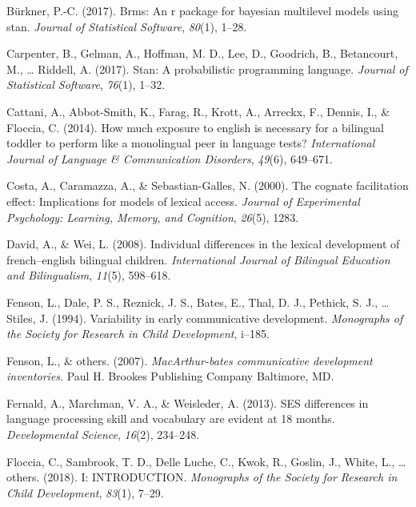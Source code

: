 \documentclass[
  english,
  man,man,floatsintext]{apa6}
\newlength{\cslhangindent}
\newenvironment{CSLReferences}[2] %
 {%
  \setlength{\parindent}{0pt}
  \ifodd #1 \everypar{\setlength{\hangindent}{\cslhangindent}}\ignorespaces\fi
  \ifnum #2 > 0
  \setlength{\parskip}{#2\baselineskip}
  \fi
 }%
 {}
\begin{document}
\begin{CSLReferences}{1}{0}
\leavevmode{}%
Bürkner, P.-C. (2017). Brms: An r package for bayesian multilevel models using stan. \emph{Journal of Statistical Software}, \emph{80}(1), 1--28.

\leavevmode{}%
Carpenter, B., Gelman, A., Hoffman, M. D., Lee, D., Goodrich, B., Betancourt, M., \ldots{} Riddell, A. (2017). Stan: A probabilistic programming language. \emph{Journal of Statistical Software}, \emph{76}(1), 1--32.

\leavevmode{}%
Cattani, A., Abbot-Smith, K., Farag, R., Krott, A., Arreckx, F., Dennis, I., \& Floccia, C. (2014). How much exposure to english is necessary for a bilingual toddler to perform like a monolingual peer in language tests? \emph{International Journal of Language \& Communication Disorders}, \emph{49}(6), 649--671.

\leavevmode{}%
Costa, A., Caramazza, A., \& Sebastian-Galles, N. (2000). The cognate facilitation effect: Implications for models of lexical access. \emph{Journal of Experimental Psychology: Learning, Memory, and Cognition}, \emph{26}(5), 1283.

\leavevmode{}%
David, A., \& Wei, L. (2008). Individual differences in the lexical development of french--english bilingual children. \emph{International Journal of Bilingual Education and Bilingualism}, \emph{11}(5), 598--618.

\leavevmode{}%
Fenson, L., Dale, P. S., Reznick, J. S., Bates, E., Thal, D. J., Pethick, S. J., \ldots{} Stiles, J. (1994). Variability in early communicative development. \emph{Monographs of the Society for Research in Child Development}, i--185.

\leavevmode{}%
Fenson, L., \& others. (2007). \emph{MacArthur-bates communicative development inventories}. Paul H. Brookes Publishing Company Baltimore, MD.

\leavevmode{}%
Fernald, A., Marchman, V. A., \& Weisleder, A. (2013). SES differences in language processing skill and vocabulary are evident at 18 months. \emph{Developmental Science}, \emph{16}(2), 234--248.

\leavevmode{}%
Floccia, C., Sambrook, T. D., Delle Luche, C., Kwok, R., Goslin, J., White, L., \ldots{} others. (2018). I: INTRODUCTION. \emph{Monographs of the Society for Research in Child Development}, \emph{83}(1), 7--29.


\end{CSLReferences}
\end{document}
